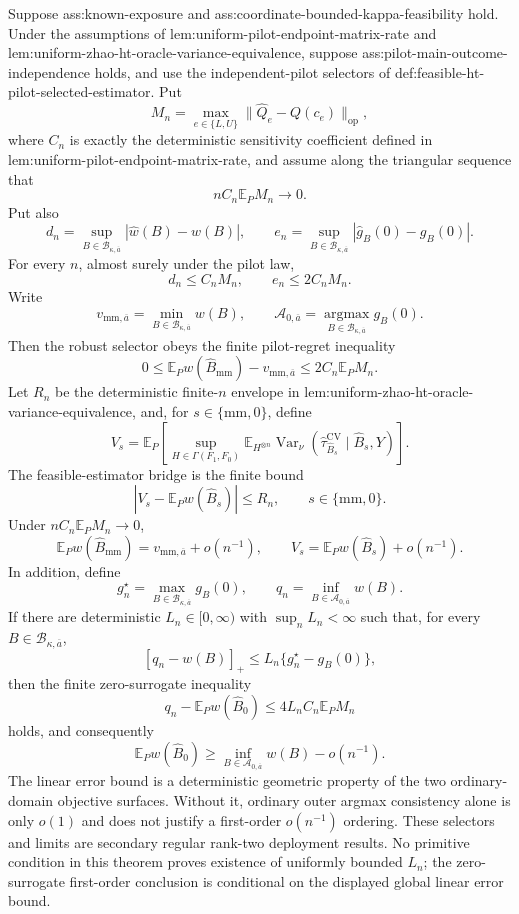 Suppose ass:known-exposure and ass:coordinate-bounded-kappa-feasibility hold.  Under the assumptions of lem:uniform-pilot-endpoint-matrix-rate and lem:uniform-zhao-ht-oracle-variance-equivalence, suppose ass:pilot-main-outcome-independence holds, and use the independent-pilot selectors of def:feasible-ht-pilot-selected-estimator.  Put
\[
M_n=\max_{e\in\{L,U\}}\lVert\widehat Q_e-Q(c_e)\rVert_{\mathrm{op}},
\]
where \(C_n\) is exactly the deterministic sensitivity coefficient defined in lem:uniform-pilot-endpoint-matrix-rate, and assume along the triangular sequence that
\[
nC_n\mathbb E_PM_n\longrightarrow0.
\]
Put also
\[
d_n=\sup_{B\in\mathcal B_{\kappa,\overline a}}|\widehat w(B)-w(B)|,
\qquad
e_n=\sup_{B\in\mathcal B_{\kappa,\overline a}}|\widehat g_B(0)-g_B(0)|.
\]
For every \(n\), almost surely under the pilot law,
\[
d_n\le C_nM_n,
\qquad e_n\le2C_nM_n.
\]
Write
\[
v_{\mathrm{mm},\overline a}=\min_{B\in\mathcal B_{\kappa,\overline a}}w(B),
\qquad
\mathcal A_{0,\overline a}=\operatorname*{argmax}_{B\in\mathcal B_{\kappa,\overline a}}g_B(0).
\]
Then the robust selector obeys the finite pilot-regret inequality
\[
0\le
\mathbb E_Pw(\widehat B_{\mathrm{mm}})-v_{\mathrm{mm},\overline a}
\le2C_n\mathbb E_PM_n.
\]
Let \(R_n\) be the deterministic finite-\(n\) envelope in lem:uniform-zhao-ht-oracle-variance-equivalence, and, for \(s\in\{\mathrm{mm},0\}\), define
\[
V_s=
\mathbb E_P\left[
\sup_{H\in\Gamma(F_1,F_0)}
\mathbb E_{H^{\otimes n}}
\operatorname{Var}_\nu
(\widehat\tau_{\widehat B_s}^{\mathrm{CV}}\mid\widehat B_s,Y)
\right].
\]
The feasible-estimator bridge is the finite bound
\[
|V_s-\mathbb E_Pw(\widehat B_s)|\le R_n,
\qquad s\in\{\mathrm{mm},0\}.
\]
Under \(nC_n\mathbb E_PM_n\to0\),
\[
\mathbb E_Pw(\widehat B_{\mathrm{mm}})
=v_{\mathrm{mm},\overline a}+o(n^{-1}),
\qquad
V_s=\mathbb E_Pw(\widehat B_s)+o(n^{-1}).
\]
In addition, define
\[
g_n^\star=\max_{B\in\mathcal B_{\kappa,\overline a}}g_B(0),
\qquad
q_n=\inf_{B\in\mathcal A_{0,\overline a}}w(B).
\]
If there are deterministic \(L_n\in[0,\infty)\) with \(\sup_nL_n<\infty\) such that, for every \(B\in\mathcal B_{\kappa,\overline a}\),
\[
[q_n-w(B)]_+\le L_n\{g_n^\star-g_B(0)\},
\]
then the finite zero-surrogate inequality
\[
q_n-\mathbb E_Pw(\widehat B_0)
\le4L_nC_n\mathbb E_PM_n
\]
holds, and consequently
\[
\mathbb E_Pw(\widehat B_0)
\ge\inf_{B\in\mathcal A_{0,\overline a}}w(B)-o(n^{-1}).
\]
The linear error bound is a deterministic geometric property of the two ordinary-domain objective surfaces.  Without it, ordinary outer argmax consistency alone is only \(o(1)\) and does not justify a first-order \(o(n^{-1})\) ordering.  These selectors and limits are secondary regular rank-two deployment results.  No primitive condition in this theorem proves existence of uniformly bounded \(L_n\); the zero-surrogate first-order conclusion is conditional on the displayed global linear error bound.